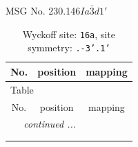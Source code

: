 \documentclass[fleqn,8pt]{jsarticle}
\begin{document}
\setcounter{MaxMatrixCols}{32}

\renewcommand{\tablename}{Table~}
\renewcommand{\figurename}{Figure~}
\begin{center}
\LARGE
MSG No. 230.146\quad$Ia\bar{3}d1'$
\end{center}
\renewcommand{\arraystretch}{1.2}
\begin{longtable}{ccc}
\caption{Wyckoff site: {\tt 16a}, site symmetry: {\tt .-3'.1'}}
 \\
 \hline \hline
No. & position & mapping \\ \hline \endfirsthead

\multicolumn{2}{l}{\tablename\ \thetable{}} \\
 \hline \hline
No. & position & mapping \\ \hline \endhead

 \hline \hline
\multicolumn{2}{r}{\footnotesize\it continued ...} \\ \endfoot

 \hline \hline
\multicolumn{2}{r}{} \\ \endlastfoot


\end{longtable}
\end{document}
